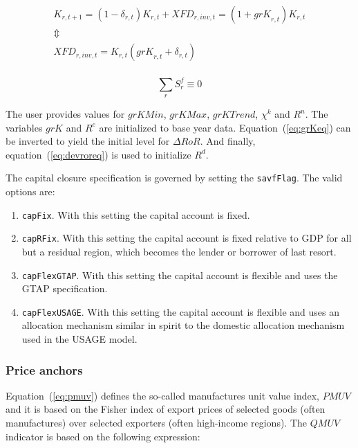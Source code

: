 \documentclass[11pt,letterpaper]{report}
\begin{document}
\begin{equation}
\label{eq:savfeqUSAGE}
\begin{array}{c}
K_{r,t+1} = (1-\delta_{r,t}) K_{r,t} + \mathit{XFD}_{r,\mathit{inv},t}
          = \left(1+\mathit{grK}_{r,t}\right)K_{r,t} \\
\Updownarrow \\
\mathit{XFD}_{r,\mathit{inv},t} =
   K_{r,t}\left( \mathit{grK}_{r,t} + \delta_{r,t} \right) \\
\end{array}
\end{equation}

\begin{equation}
\label{eq:rorgflexUSAGE}
\sum_r{S^f_r} \equiv 0
\end{equation}

The user provides values for $\mathit{grKMin}$, $\mathit{grKMax}$,
$\mathit{grKTrend}$, $\chi^k$ and $\mathit{R}^n$. The variables $\mathit{grK}$
and $\mathit{R}^e$ are initialized to base year data. Equation~(\ref{eq:grKeq})
can be inverted to yield the initial level for $\mathit{\Delta{\mathit{RoR}}}$.
And finally, equation~(\ref{eq:devroreq}) is used to initialize $R^d$.

The capital closure specification is governed by setting the \texttt{savfFlag}.
The valid options are:

\begin{enumerate}
   \item \texttt{capFix}. With this setting the capital account is fixed.
   \item \texttt{capRFix}. With this setting the capital account is
   fixed relative to GDP for all but a residual region, which becomes
   the lender or borrower of last resort.
   \item \texttt{capFlexGTAP}. With this setting the capital account is flexible
         and uses the GTAP specification.
   \item \texttt{capFlexUSAGE}. With this setting the capital account is
         flexible and uses an allocation mechanism similar in spirit to the
         domestic allocation mechanism used in the USAGE model.
\end{enumerate}

\subsubsection{Price anchors}

Equation~(\ref{eq:pmuv}) defines the so-called manufactures unit value index,
$\mathit{PMUV}$ and it is based on the Fisher index of export prices of selected
goods (often manufactures) over selected exporters (often high-income regions).
The $\mathit{QMUV}$ indicator is based on the following expression:
\end{document}
